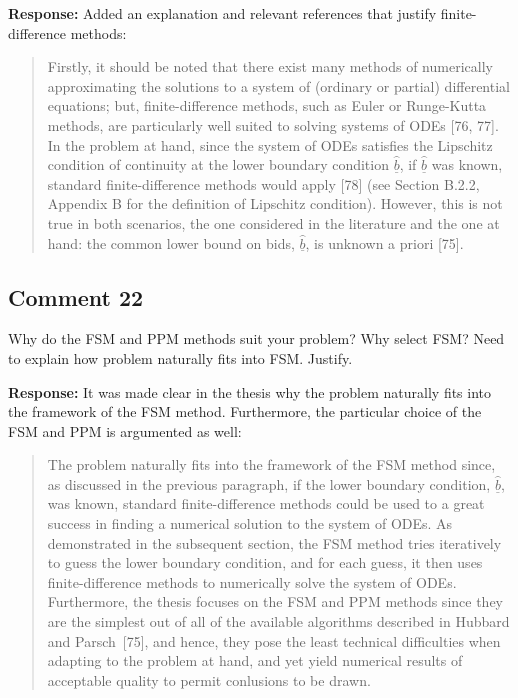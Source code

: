 \documentclass[10pt,a4paper,notitlepage]{article}
\numberwithin{equation}{section}
\begin{document}
\textbf{Response:}
Added an explanation and relevant references that justify finite-difference methods:
\begin{quote}
Firstly, it should be noted that there exist many methods of numerically approximating the solutions to a system of (ordinary or partial) differential equations; but, finite-difference methods, such as Euler or Runge-Kutta methods, are particularly well suited to solving systems of ODEs [76, 77]. In the problem at hand, since the system of ODEs satisfies the Lipschitz condition of continuity at the lower boundary condition $\underline{\hat{b}}$, if $\underline{\hat{b}}$ was known, standard finite-difference methods would apply [78] (see Section B.2.2, Appendix B for the definition of Lipschitz condition). However, this is not true in both scenarios, the one considered in the literature and the one at hand: the common lower bound on bids, $\underline{\hat{b}}$, is unknown a priori [75].
\end{quote}

\subsection{Comment 22}
Why do the FSM and PPM methods suit your problem? Why select FSM? Need to explain how problem naturally fits into FSM. Justify.

\textbf{Response:}
It was made clear in the thesis why the problem naturally fits into the framework of the FSM method. Furthermore, the particular choice of the FSM and PPM is argumented as well:
\begin{quote}
  The problem naturally fits into the framework of the FSM method since, as discussed in the previous paragraph, if the lower boundary condition, $\underline{\hat{b}}$, was known, standard finite-difference methods could be used to a great success in finding a numerical solution to the system of ODEs. As demonstrated in the subsequent section, the FSM method tries iteratively to guess the lower boundary condition, and for each guess, it then uses finite-difference methods to numerically solve the system of ODEs. Furthermore, the thesis focuses on the FSM and PPM methods since they are the simplest out of all of the available algorithms described in Hubbard and Parsch~[75], and hence, they pose the least technical difficulties when adapting to the problem at hand, and yet yield numerical results of acceptable quality to permit conlusions to be drawn.
\end{quote}
\end{document}
